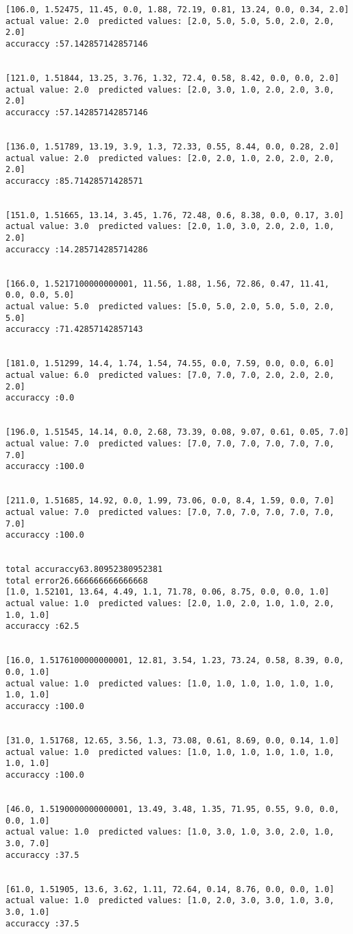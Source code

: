 \documentclass[11pt]{article}
\begin{document}
\begin{Verbatim}[commandchars=\\\{\}]
[106.0, 1.52475, 11.45, 0.0, 1.88, 72.19, 0.81, 13.24, 0.0, 0.34, 2.0]
actual value: 2.0  predicted values: [2.0, 5.0, 5.0, 5.0, 2.0, 2.0, 2.0]
accuraccy :57.142857142857146


[121.0, 1.51844, 13.25, 3.76, 1.32, 72.4, 0.58, 8.42, 0.0, 0.0, 2.0]
actual value: 2.0  predicted values: [2.0, 3.0, 1.0, 2.0, 2.0, 3.0, 2.0]
accuraccy :57.142857142857146


[136.0, 1.51789, 13.19, 3.9, 1.3, 72.33, 0.55, 8.44, 0.0, 0.28, 2.0]
actual value: 2.0  predicted values: [2.0, 2.0, 1.0, 2.0, 2.0, 2.0, 2.0]
accuraccy :85.71428571428571


[151.0, 1.51665, 13.14, 3.45, 1.76, 72.48, 0.6, 8.38, 0.0, 0.17, 3.0]
actual value: 3.0  predicted values: [2.0, 1.0, 3.0, 2.0, 2.0, 1.0, 2.0]
accuraccy :14.285714285714286


[166.0, 1.5217100000000001, 11.56, 1.88, 1.56, 72.86, 0.47, 11.41, 0.0, 0.0, 5.0]
actual value: 5.0  predicted values: [5.0, 5.0, 2.0, 5.0, 5.0, 2.0, 5.0]
accuraccy :71.42857142857143


[181.0, 1.51299, 14.4, 1.74, 1.54, 74.55, 0.0, 7.59, 0.0, 0.0, 6.0]
actual value: 6.0  predicted values: [7.0, 7.0, 7.0, 2.0, 2.0, 2.0, 2.0]
accuraccy :0.0


[196.0, 1.51545, 14.14, 0.0, 2.68, 73.39, 0.08, 9.07, 0.61, 0.05, 7.0]
actual value: 7.0  predicted values: [7.0, 7.0, 7.0, 7.0, 7.0, 7.0, 7.0]
accuraccy :100.0


[211.0, 1.51685, 14.92, 0.0, 1.99, 73.06, 0.0, 8.4, 1.59, 0.0, 7.0]
actual value: 7.0  predicted values: [7.0, 7.0, 7.0, 7.0, 7.0, 7.0, 7.0]
accuraccy :100.0


total accuraccy63.80952380952381
total error26.666666666666668
[1.0, 1.52101, 13.64, 4.49, 1.1, 71.78, 0.06, 8.75, 0.0, 0.0, 1.0]
actual value: 1.0  predicted values: [2.0, 1.0, 2.0, 1.0, 1.0, 2.0, 1.0, 1.0]
accuraccy :62.5


[16.0, 1.5176100000000001, 12.81, 3.54, 1.23, 73.24, 0.58, 8.39, 0.0, 0.0, 1.0]
actual value: 1.0  predicted values: [1.0, 1.0, 1.0, 1.0, 1.0, 1.0, 1.0, 1.0]
accuraccy :100.0


[31.0, 1.51768, 12.65, 3.56, 1.3, 73.08, 0.61, 8.69, 0.0, 0.14, 1.0]
actual value: 1.0  predicted values: [1.0, 1.0, 1.0, 1.0, 1.0, 1.0, 1.0, 1.0]
accuraccy :100.0


[46.0, 1.5190000000000001, 13.49, 3.48, 1.35, 71.95, 0.55, 9.0, 0.0, 0.0, 1.0]
actual value: 1.0  predicted values: [1.0, 3.0, 1.0, 3.0, 2.0, 1.0, 3.0, 7.0]
accuraccy :37.5


[61.0, 1.51905, 13.6, 3.62, 1.11, 72.64, 0.14, 8.76, 0.0, 0.0, 1.0]
actual value: 1.0  predicted values: [1.0, 2.0, 3.0, 3.0, 1.0, 3.0, 3.0, 1.0]
accuraccy :37.5



\end{Verbatim}
\end{document}

